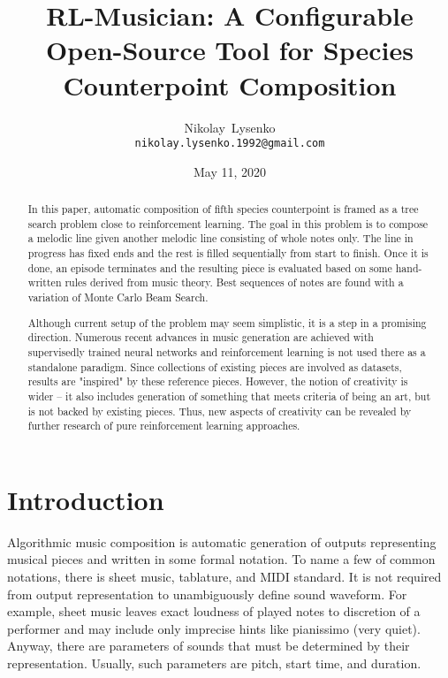 \documentclass{article}
\title{RL-Musician: A Configurable Open-Source Tool for Species Counterpoint Composition}
\date{May 11, 2020}
\author{
  Nikolay~Lysenko\\
  \texttt{nikolay.lysenko.1992@gmail.com} \\
}
\begin{document}
\maketitle

\begin{abstract}
In this paper, automatic composition of fifth species counterpoint is framed as a tree search problem close to reinforcement learning. The goal in this problem is to compose a melodic line given another melodic line consisting of whole notes only. The line in progress has fixed ends and the rest is filled sequentially from start to finish. Once it is done, an episode terminates and the resulting piece is evaluated based on some hand-written rules derived from music theory. Best sequences of notes are found with a variation of Monte Carlo Beam Search.

Although current setup of the problem may seem simplistic, it is a step in a promising direction. Numerous recent advances in music generation are achieved with supervisedly trained neural networks and reinforcement learning is not used there as a standalone paradigm. Since collections of existing pieces are involved as datasets, results are "inspired" by these reference pieces. However, the notion of creativity is wider -- it also includes generation of something that meets criteria of being an art, but is not backed by existing pieces. Thus, new aspects of creativity can be revealed by further research of pure reinforcement learning approaches.
\end{abstract}



\section{Introduction}
\label{sec:introduction}

Algorithmic music composition is automatic generation of outputs representing musical pieces and written in some formal notation. To name a few of common notations, there is sheet music, tablature, and MIDI standard. It is not required from output representation to unambiguously define sound waveform. For example, sheet music leaves exact loudness of played notes to discretion of a performer and may include only imprecise hints like pianissimo (very quiet). Anyway, there are parameters of sounds that must be determined by their representation. Usually, such parameters are pitch, start time, and duration.
\end{document}
